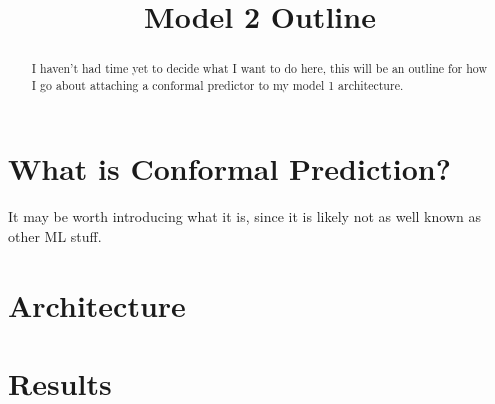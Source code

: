 \documentclass[11pt]{article}
\title{Model 2 Outline}
\author{}
\date{}
\begin{document}
\maketitle

\begin{abstract}
    I haven't had time yet to decide what I want to do here, this will be an outline for how I go about attaching a conformal predictor to my model 1 architecture.
\end{abstract}


\section{What is Conformal Prediction?}
    It may be worth introducing what it is, since it is likely not as well known as other ML stuff.

\section{Architecture}

\section{Results}
\end{document}
